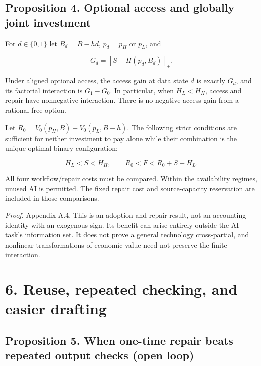 \documentclass[
  11pt,
  a4paper,
]{article}
\begin{document}
\hypertarget{proposition-4.-optional-access-and-globally-joint-investment}{%
\subsection{Proposition 4. Optional access and globally joint
investment}\label{proposition-4.-optional-access-and-globally-joint-investment}}

For \(d\in\{0,1\}\) let \(B_d=B-hd\), \(p_d=p_H\) or \(p_L\), and

\[G_d=[S-H(p_d,B_d)]_+.\]

Under aligned optional access, the access gain at data state \(d\) is
exactly \(G_d\), and its factorial interaction is \(G_1-G_0\). In
particular, when \(H_L<H_H\), access and repair have nonnegative
interaction. There is no negative access gain from a rational free
option.

Let \(R_0=V_0(p_H,B)-V_0(p_L,B-h)\). The following strict conditions are
sufficient for neither investment to pay alone while their combination
is the unique optimal binary configuration:

\[H_L<S<H_H,\qquad R_0<F<R_0+S-H_L. \tag{17}\]

All four workflow/repair costs must be compared. Within the availability
regimes, unused AI is permitted. The fixed repair cost and
source-capacity reservation are included in those comparisons.

\emph{Proof.} Appendix A.4. This is an adoption-and-repair result, not
an accounting identity with an exogenous sign. Its benefit can arise
entirely outside the AI task's information set. It does not prove a
general technology cross-partial, and nonlinear transformations of
economic value need not preserve the finite interaction.

\hypertarget{reuse-repeated-checking-and-easier-drafting}{%
\section{6. Reuse, repeated checking, and easier
drafting}\label{reuse-repeated-checking-and-easier-drafting}}

\hypertarget{proposition-5.-when-one-time-repair-beats-repeated-output-checks-open-loop}{%
\subsection{Proposition 5. When one-time repair beats repeated output
checks (open
loop)}\label{proposition-5.-when-one-time-repair-beats-repeated-output-checks-open-loop}}
\end{document}
